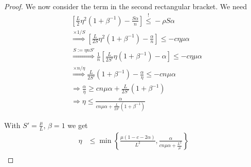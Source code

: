 \documentclass[12pt]{article}
\begin{document}
\begin{proof}
We now consider the term in the second rectangular bracket. We need
\begin{align}
& \left[ \frac{L}{2} \eta^2 (1+\beta^{-1}) - \frac{S\alpha}{n} \right] \stackrel{!}\leq - \rho S\alpha \nonumber \\
& \stackrel{\times 1/S}\Longrightarrow \left[ \frac{L}{2S} \eta^2 (1+\beta^{-1}) - \frac{\alpha}{n} \right] \leq - c \eta \mu \alpha \nonumber \\
& \stackrel{S:=\eta n S'}\Longrightarrow \frac{1}{n} \left[ \frac{L}{2S'} \eta (1+\beta^{-1}) - \alpha \right] \leq - c \eta \mu \alpha \nonumber \\
& \stackrel{\times n/\eta}\Longrightarrow \frac{L}{2S'} (1+\beta^{-1}) - \frac{\alpha}{\eta} \leq - c n \mu \alpha \nonumber \\
& \Longrightarrow \frac{\alpha}{\eta} \geq c n \mu \alpha + \frac{L}{2S'} (1+\beta^{-1}) \nonumber \\
& \Longrightarrow \eta \leq \frac{\alpha}{c n \mu \alpha + \frac{L}{2S'} (1+\beta^{-1})}
\end{align}


With $S'=\frac{\mu}{L}$, $\beta=1$ we get
\begin{align}
\eta &\leq \min \left\{ 
\frac{\mu(1 - c - 2\alpha)}{L^2},
\frac{\alpha}{c n \mu \alpha + \frac{L^2}{\mu}} \right\} \nonumber \\
\end{align}

\end{proof}
\end{document}
